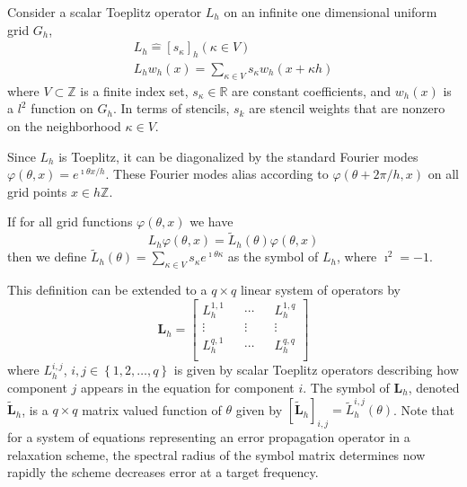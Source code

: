Consider a scalar Toeplitz operator $L_h$ on an infinite one dimensional uniform grid $G_h$,
\begin{equation}
\begin{split}
L_h \mathrel{\hat{=}} \left[ s_\kappa \right]_h \left( \kappa \in V \right)\\
L_h w_h \left( x \right) = \sum_{\kappa \in V} s_\kappa w_h \left( x + \kappa h \right)
\end{split}
\end{equation}
where $V \subset \mathbb{Z}$ is a finite index set, $s_\kappa \in \mathbb{R}$ are constant coefficients, and $w_h \left( x \right)$ is a $l^2$ function on $G_h$.
In terms of stencils, $s_k$ are stencil weights that are nonzero on the neighborhood $\kappa \in V$.

Since $L_h$ is Toeplitz, it can be diagonalized by the standard Fourier modes $\varphi \left( \theta, x \right) = e^{\imath \theta x / h}$.
These Fourier modes alias according to $\varphi \left( \theta + 2 \pi / h, x \right)$ on all grid points $x \in h \mathbb{Z}$.

\begin{definition}[Symbol of $L_h$]\label{def:symbol}
If for all grid functions $\varphi \left( \theta, x \right)$ we have
\begin{equation}
L_h \varphi \left( \theta, x \right) = \tilde{L}_h \left( \theta \right) \varphi \left( \theta, x \right)
\end{equation}
then we define $\tilde{L}_h \left( \theta \right) = \sum_{\kappa \in V} s_\kappa e^{\imath \theta \kappa}$ as the symbol of $L_h$, where $\imath^2 = -1$.
\end{definition}

This definition can be extended to a $q \times q$ linear system of operators by
\begin{equation}
\mathbf{L}_h =
\begin{bmatrix}
    L_h^{1, 1} && \cdots && L_h^{1, q}        \\
    \vdots               && \vdots && \vdots  \\
    L_h^{q, 1} && \cdots && L_h^{q, q}        \\
\end{bmatrix}
\end{equation}
where $L_h^{i, j}$, $i, j \in \left\lbrace 1, 2, \dots, q \right\rbrace$ is given by scalar Toeplitz operators describing how component $j$ appears in the equation for component $i$.
The symbol of $\mathbf{L}_h$, denoted $\tilde{\mathbf{L}}_h$, is a $q \times q$ matrix valued function of $\theta$ given by $\left[ \tilde{\mathbf{L}}_h \right]_{i, j} = \tilde{L}_h^{i, j} \left( \theta \right)$.
Note that for a system of equations representing an error propagation operator in a relaxation scheme, the spectral radius of the symbol matrix determines now rapidly the scheme decreases error at a target frequency.

